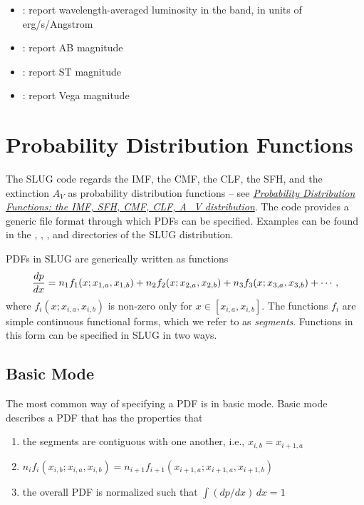 \documentclass[letterpaper,10pt,english]{sphinxmanual}
\begin{document}
\begin{itemize}
\begin{description}
\begin{itemize}
\item {} 
: report wavelength-averaged luminosity in the band, in units of erg/s/Angstrom

\item {} 
: report AB magnitude

\item {} 
: report ST magnitude

\item {} 
: report Vega magnitude

\end{itemize}

\end{description}

\end{itemize}


\chapter{Probability Distribution Functions}
\label{pdfs:probability-distribution-functions}\label{pdfs::doc}\label{pdfs:sec-pdfs}
The SLUG code regards the IMF, the CMF, the CLF, the SFH, and the extinction \(A_V\) as probability distribution functions -- see {\hyperref[intro:ssec-slugpdfs]{\emph{Probability Distribution Functions: the IMF, SFH, CMF, CLF, A\_V distribution}}}. The code provides a generic file format through which PDFs can be specified. Examples can be found in the , , , and  directories of the SLUG distribution.

PDFs in SLUG are generically written as functions
\begin{gather}
\begin{split}\frac{dp}{dx} = n_1 f_1(x; x_{1,a}, x_{1,b}) + n_2 f_2(x; x_{2,a}, x_{2,b}) + n_3 f_3(x; x_{3,a}, x_{3,b}) + \cdots,\end{split}\notag
\end{gather}
where \(f_i(x; x_{i,a}, x_{i,b})\) is non-zero only for \(x \in [x_{i,a}, x_{i,b}]\). The functions \(f_i\) are simple continuous functional forms, which we refer to as \emph{segments}. Functions in this form can be specified in SLUG in two ways.


\section{Basic Mode}
\label{pdfs:basic-mode}
The most common way of specifying a PDF is in basic mode. Basic mode describes a PDF that has the properties that
\begin{enumerate}
\item {} 
the segments are contiguous with one another, i.e., \(x_{i,b} = x_{i+1,a}\)

\item {} 
\(n_i f_i(x_{i,b}; x_{i,a}, x_{i,b}) = n_{i+1} f_{i+1}(x_{i+1,a}; x_{i+1,a}, x_{i+1,b})\)

\item {} 
the overall PDF is normalized such that \(\int (dp/dx)\, dx = 1\)

\end{enumerate}
\end{document}
